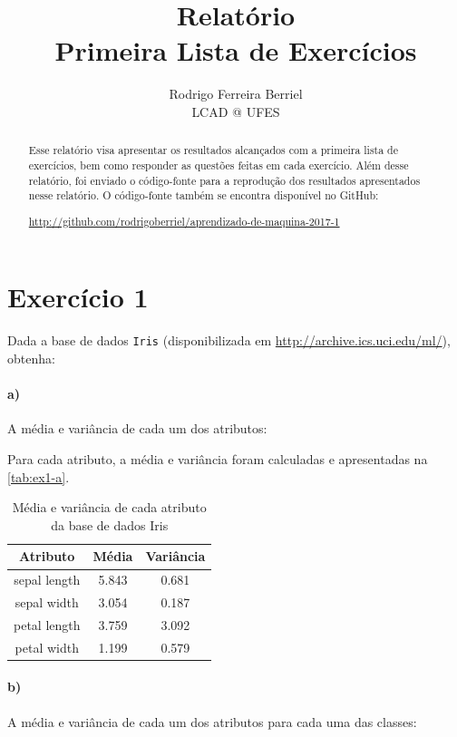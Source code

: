 \documentclass{article}
\title{Relatório\\Primeira Lista de Exercícios}
\author{
  Rodrigo Ferreira Berriel\\
  LCAD @ UFES
}
\begin{document}
\maketitle

\begin{abstract}
  Esse relatório visa apresentar os resultados alcançados com a primeira lista de exercícios, bem como responder as questões feitas em cada exercício. Além desse relatório, foi enviado o código-fonte para a reprodução dos resultados apresentados nesse relatório. O código-fonte também se encontra disponível no GitHub:
  
  \url{http://github.com/rodrigoberriel/aprendizado-de-maquina-2017-1}
\end{abstract}

\section{Exercício 1}

Dada a base de dados \texttt{Iris} (disponibilizada em \url{http://archive.ics.uci.edu/ml/}), obtenha:

\paragraph{a)} A média e variância de cada um dos atributos:

Para cada atributo, a média e variância foram calculadas e apresentadas na \autoref{tab:ex1-a}.

\begin{table}[h]
	\centering
	\caption{Média e variância de cada atributo da base de dados Iris}
	\label{tab:ex1-a}
	\begin{tabular}{@{}ccc@{}}
		\toprule
		Atributo         & Média & Variância \\ \midrule
		sepal length     & 5.843 & 0.681     \\
		sepal width      & 3.054 & 0.187     \\
		petal length     & 3.759 & 3.092     \\
		petal width      & 1.199 & 0.579     \\ \bottomrule
	\end{tabular}
\end{table}



\paragraph{b)} A média e variância de cada um dos atributos para cada uma das classes:
\end{document}
